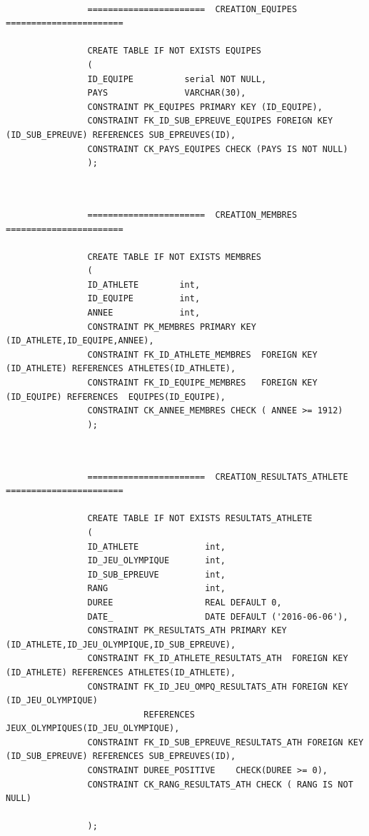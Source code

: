\documentclass[]{scrreprt}
\begin{document}
			{\footnotesize 
				\begin{verbatim}
				
				=======================  CREATION_EQUIPES  =======================
				
				CREATE TABLE IF NOT EXISTS EQUIPES
				(
				ID_EQUIPE          serial NOT NULL,
				PAYS               VARCHAR(30),
				CONSTRAINT PK_EQUIPES PRIMARY KEY (ID_EQUIPE),
				CONSTRAINT FK_ID_SUB_EPREUVE_EQUIPES FOREIGN KEY (ID_SUB_EPREUVE) REFERENCES SUB_EPREUVES(ID),
				CONSTRAINT CK_PAYS_EQUIPES CHECK (PAYS IS NOT NULL)
				);
				
				\end{verbatim}}
			
			{\footnotesize 
				\begin{verbatim}
				
				=======================  CREATION_MEMBRES  =======================
				
				CREATE TABLE IF NOT EXISTS MEMBRES
				(
				ID_ATHLETE        int,
				ID_EQUIPE         int,
				ANNEE             int,
				CONSTRAINT PK_MEMBRES PRIMARY KEY (ID_ATHLETE,ID_EQUIPE,ANNEE),
				CONSTRAINT FK_ID_ATHLETE_MEMBRES  FOREIGN KEY (ID_ATHLETE) REFERENCES ATHLETES(ID_ATHLETE),
				CONSTRAINT FK_ID_EQUIPE_MEMBRES   FOREIGN KEY (ID_EQUIPE) REFERENCES  EQUIPES(ID_EQUIPE),
				CONSTRAINT CK_ANNEE_MEMBRES CHECK ( ANNEE >= 1912)
				);
				
				\end{verbatim}}
			
			{\footnotesize 
				\begin{verbatim}
				
				=======================  CREATION_RESULTATS_ATHLETE  =======================
				
				CREATE TABLE IF NOT EXISTS RESULTATS_ATHLETE
				(
				ID_ATHLETE             int,
				ID_JEU_OLYMPIQUE       int,
				ID_SUB_EPREUVE         int,
				RANG                   int,
				DUREE                  REAL DEFAULT 0,
				DATE_                  DATE DEFAULT ('2016-06-06'),
				CONSTRAINT PK_RESULTATS_ATH PRIMARY KEY (ID_ATHLETE,ID_JEU_OLYMPIQUE,ID_SUB_EPREUVE),
				CONSTRAINT FK_ID_ATHLETE_RESULTATS_ATH  FOREIGN KEY (ID_ATHLETE) REFERENCES ATHLETES(ID_ATHLETE),
				CONSTRAINT FK_ID_JEU_OMPQ_RESULTATS_ATH FOREIGN KEY (ID_JEU_OLYMPIQUE) 
				           REFERENCES JEUX_OLYMPIQUES(ID_JEU_OLYMPIQUE),
				CONSTRAINT FK_ID_SUB_EPREUVE_RESULTATS_ATH FOREIGN KEY (ID_SUB_EPREUVE) REFERENCES SUB_EPREUVES(ID),
				CONSTRAINT DUREE_POSITIVE    CHECK(DUREE >= 0),
				CONSTRAINT CK_RANG_RESULTATS_ATH CHECK ( RANG IS NOT NULL)
				
				);
				
				\end{verbatim}}
			
\end{document}
